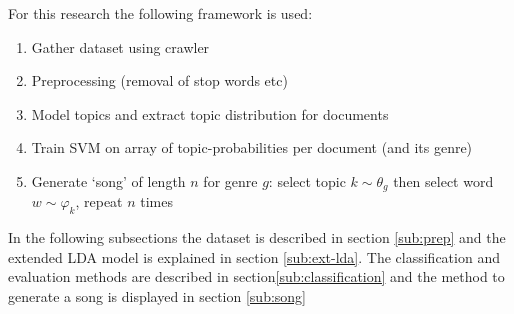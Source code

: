 
For this research the following framework is used:
\begin{enumerate}
	\item Gather dataset using crawler
	\item Preprocessing (removal of stop words etc)
	\item Model topics and extract topic distribution for documents
	\item Train SVM on array of topic-probabilities per document (and its genre)
	\item Generate `song' of length $n$ for genre $g$: select topic $k \sim \theta_g$ then select word $w \sim \varphi_k$, repeat $n$ times
\end{enumerate}

In the following subsections the dataset is described in section \ref{sub:prep} and the extended LDA model is explained in section \ref{sub:ext-lda}. The classification and evaluation methods are described in section\ref{sub:classification} and the method to generate a song is displayed in section \ref{sub:song}

